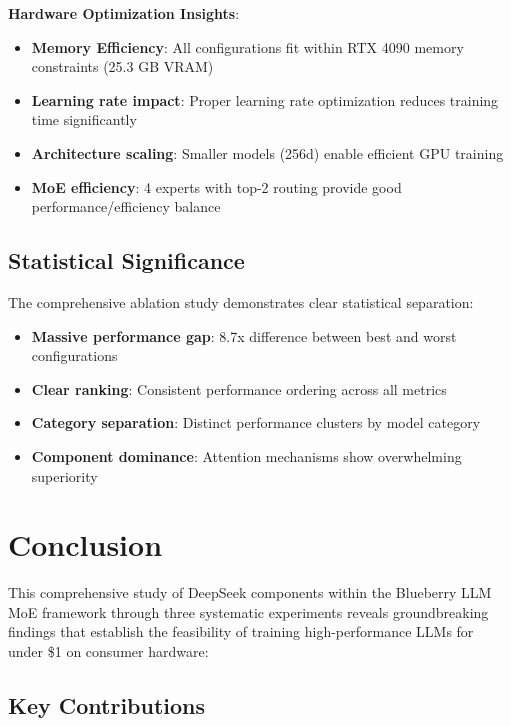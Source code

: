 \documentclass[11pt,a4paper]{article}
\begin{document}
\textbf{Hardware Optimization Insights}:
\begin{itemize}
    \item \textbf{Memory Efficiency}: All configurations fit within RTX 4090 memory constraints (25.3 GB VRAM)
    \item \textbf{Learning rate impact}: Proper learning rate optimization reduces training time significantly
    \item \textbf{Architecture scaling}: Smaller models (256d) enable efficient GPU training
    \item \textbf{MoE efficiency}: 4 experts with top-2 routing provide good performance/efficiency balance
\end{itemize}

\subsection{Statistical Significance}

The comprehensive ablation study demonstrates clear statistical separation:
\begin{itemize}
    \item \textbf{Massive performance gap}: 8.7x difference between best and worst configurations
    \item \textbf{Clear ranking}: Consistent performance ordering across all metrics
    \item \textbf{Category separation}: Distinct performance clusters by model category
    \item \textbf{Component dominance}: Attention mechanisms show overwhelming superiority
\end{itemize}

\section{Conclusion}

This comprehensive study of DeepSeek components within the Blueberry LLM MoE framework through three systematic experiments reveals groundbreaking findings that establish the feasibility of training high-performance LLMs for under \$1 on consumer hardware:

\subsection{Key Contributions}
\end{document}
